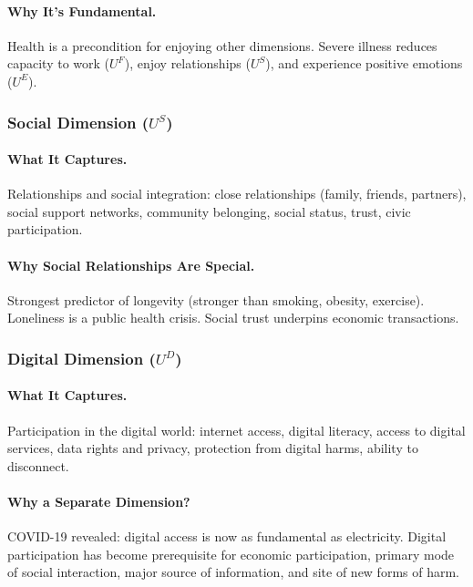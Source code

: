 \paragraph{Why It's Fundamental.}
Health is a precondition for enjoying other dimensions. Severe illness reduces capacity 
to work ($U^F$), enjoy relationships ($U^S$), and experience positive emotions ($U^E$).

\subsubsection{Social Dimension ($U^S$)}

\paragraph{What It Captures.}
Relationships and social integration: close relationships (family, friends, partners),
social support networks, community belonging, social status, trust, civic participation.

\paragraph{Why Social Relationships Are Special.}
Strongest predictor of longevity (stronger than smoking, obesity, exercise).
Loneliness is a public health crisis. Social trust underpins economic transactions.

\subsubsection{Digital Dimension ($U^D$)}

\paragraph{What It Captures.}
Participation in the digital world: internet access, digital literacy, access to digital services,
data rights and privacy, protection from digital harms, ability to disconnect.

\paragraph{Why a Separate Dimension?}
COVID-19 revealed: digital access is now as fundamental as electricity.
Digital participation has become prerequisite for economic participation, primary mode of 
social interaction, major source of information, and site of new forms of harm.

